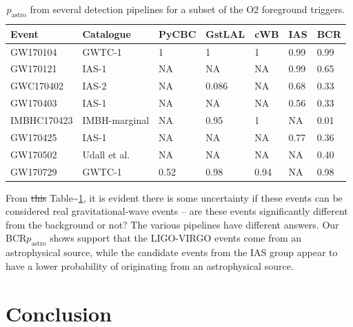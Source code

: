 \documentclass[%
preprint,
 amsmath,amssymb,
 aps,
]{revtex4}
\newcommand{\bcr}{{\sc BCR}\xspace}
\newcommand{\rs}[1]{\textcolor{red}{[RS: #1]}}
\begin{document}
\begin{table}
\caption[\rs{Put BCR first and put a box around it, indicating that this is the new results that people should focus on}$p_\text{astro}$ for various O2 foreground triggers]{\label{tab:O2significancesWObcr}$p_\text{astro}$ from several detection pipelines for a subset of the O2 foreground triggers.}
\centering
\begin{tabular}{lllllll} 
\hline
\textbf{Event} & \textbf{Catalogue} & \textbf{PyCBC} & \textbf{GstLAL} & \textbf{cWB} & \textbf{IAS} & \textbf{BCR} \\ 
\hline
GW170104 & GWTC-1 & 1 & 1 & 1 & 0.99 & 0.99 \\
GW170121 & IAS-1 & NA & NA & NA & 0.99 & 0.65 \\
GWC170402 & IAS-2 & NA & 0.086 & NA & 0.68 & 0.33 \\
GW170403 & IAS-1 & NA & NA & NA & 0.56 & 0.33 \\
IMBHC170423 & IMBH-marginal & NA & 0.95 & 1 & NA & 0.01 \\
GW170425 & IAS-1 & NA & NA & NA & 0.77 & 0.36 \\
GW170502 & Udall et al. & NA & NA & NA & NA & 0.40 \\
GW170729 & GWTC-1 & 0.52 & 0.98 & 0.94 & NA & 0.98
\end{tabular}
\end{table}



From \sout{this} Table\textasciitilde\ref{tab:O2significancesWObcr}, it is evident there is some uncertainty if these events can be considered real gravitational-wave events -- are these events significantly different from the background or not? The various pipelines have different answers. Our \bcr $p_\text{astro}$ shows support that the LIGO-VIRGO events come from an astrophysical source, while the candidate events from the IAS group appear to have a lower probability of originating from an astrophysical source.\\







\section{\label{sec:Conclusion}Conclusion}
\end{document}
